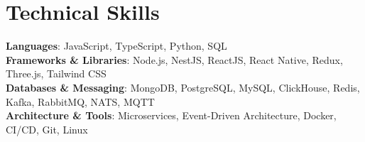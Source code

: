 \documentclass[letterpaper,11pt]{article}
\begin{document}
\section{Technical Skills}
 \begin{itemize}[leftmargin=0.15in, label={}]
    \small{\item{
     \textbf{Languages}{: JavaScript, TypeScript, Python, SQL} \\
     \textbf{Frameworks \& Libraries}{: Node.js, NestJS, ReactJS, React Native, Redux, Three.js, Tailwind CSS} \\
     \textbf{Databases \& Messaging}{: MongoDB, PostgreSQL, MySQL, ClickHouse, Redis, Kafka, RabbitMQ, NATS, MQTT} \\
     \textbf{Architecture \& Tools}{: Microservices, Event-Driven Architecture, Docker, CI/CD, Git, Linux}
    }}
 \end{itemize}


\end{document}

